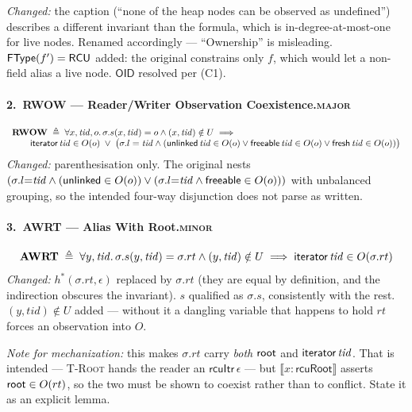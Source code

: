 \emph{Changed:} the caption (``none of the heap nodes can be observed as
undefined'') describes a different invariant than the formula, which is
in-degree-at-most-one for live nodes.  Renamed accordingly --- ``Ownership'' is
misleading.  $\textsf{FType}(f') = \textsf{RCU}$ added: the original constrains only $f$, which
would let a non-\RCU{} field alias a live node.  $\textsf{OID}$ resolved per (C1).

\paragraph{2.\ RWOW --- Reader/Writer Observation Coexistence.\hfill\textsc{major}}
\[
\begin{array}{l}
\textbf{RWOW} \;\triangleq\; \forall x,\mathit{tid},o \ldotp
  \sigma.s(x,\mathit{tid}) = o \land (x,\mathit{tid}) \notin U \implies \\
\qquad \textsf{iterator}\,\mathit{tid} \in O(o) \;\lor\; \big(\sigma.l = \mathit{tid} \land
  ( \textsf{unlinked}\,\mathit{tid} \in O(o) \lor \textsf{freeable}\,\mathit{tid} \in O(o) \lor \textsf{fresh}\,\mathit{tid} \in O(o) )\big)
\end{array}
\]
\emph{Changed:} parenthesisation only.  The original nests
$(\sigma.l{=}\mathit{tid} \land (\textsf{unlinked} \in O(o)) \lor (\sigma.l{=}\mathit{tid} \land \textsf{freeable} \in O(o)))$
with unbalanced grouping, so the intended four-way disjunction does not parse as
written.

\paragraph{3.\ AWRT --- Alias With Root.\hfill\textsc{minor}}
\[
\textbf{AWRT} \;\triangleq\; \forall y,\mathit{tid} \ldotp
  \sigma.s(y,\mathit{tid}) = \sigma.rt \land (y,\mathit{tid}) \notin U
  \implies \textsf{iterator}\,\mathit{tid} \in O(\sigma.rt)
\]
\emph{Changed:} $h^{*}(\sigma.rt,\epsilon)$ replaced by $\sigma.rt$ (they are
equal by definition, and the indirection obscures the invariant).  $s$
qualified as $\sigma.s$, consistently with the rest.  $(y,\mathit{tid}) \notin
U$ added --- without it a dangling variable that happens to hold $rt$ forces an
observation into $O$.

\emph{Note for mechanization:} this makes $\sigma.rt$ carry \emph{both}
$\textsf{root}$ and $\textsf{iterator}\,\mathit{tid}$.  That is intended --- \textsc{T-Root} hands the
reader an $\textsf{rcuItr}\,\epsilon$ --- but $\llbracket x : \textsf{rcuRoot}
\rrbracket$ asserts $\textsf{root} \in O(rt)$, so the two must be shown to coexist rather
than to conflict.  State it as an explicit lemma.

